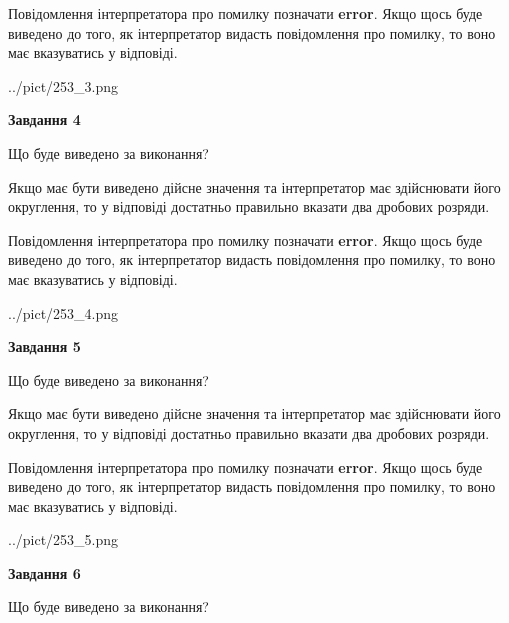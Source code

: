 \documentclass[12pt, ukrainian]{article}
\begin{document}
{\begin {Large}
Повідомлення інтерпретатора про помилку позначати \textbf{error}.
Якщо щось буде виведено до того, як інтерпретатор видасть повідомлення про помилку, 
то воно має вказуватись у відповіді. \par

\begin{center}
	{../pict/253_3.png}
\end{center}
\newpage

{\begin {center}\textbf{Завдання 4}\end {center}}\par
Що буде виведено за виконання? \par

Якщо має бути виведено дійсне значення та інтерпретатор має здійснювати його округлення, 
то у відповіді достатньо правильно вказати два дробових розряди.

Повідомлення інтерпретатора про помилку позначати \textbf{error}.
Якщо щось буде виведено до того, як інтерпретатор видасть повідомлення про помилку, 
то воно має вказуватись у відповіді. \par

\begin{center}
	{../pict/253_4.png}
\end{center}
\newpage

{\begin {center}\textbf{Завдання 5}\end {center}}\par
Що буде виведено за виконання? \par

Якщо має бути виведено дійсне значення та інтерпретатор має здійснювати його округлення, 
то у відповіді достатньо правильно вказати два дробових розряди.

Повідомлення інтерпретатора про помилку позначати \textbf{error}.
Якщо щось буде виведено до того, як інтерпретатор видасть повідомлення про помилку, 
то воно має вказуватись у відповіді. \par

\begin{center}
	{../pict/253_5.png}
\end{center}
\newpage

{\begin {center}\textbf{Завдання 6}\end {center}}\par
Що буде виведено за виконання? \par


\end{Large}}
\end{document}
